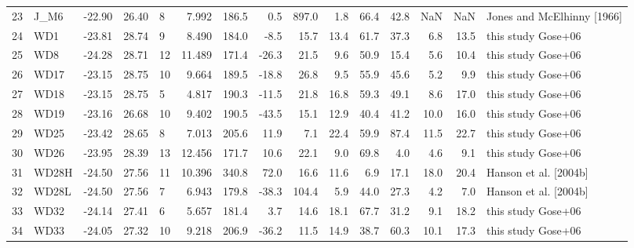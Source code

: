 \documentclass{article}
\begin{document}
{\begin{tabular}{llrrlrrrrrrrrrl}
23 &              J\_M6 &        -22.90 &          26.40 &      8 &   7.992 &  186.5 &   0.5 &  897.0 &   1.8 &  66.4 &   42.8 &   NaN &   NaN &     Jones and McElhinny [1966] \\
24 &               WD1 &        -23.81 &          28.74 &      9 &   8.490 &  184.0 &  -8.5 &   15.7 &  13.4 &  61.7 &   37.3 &   6.8 &  13.5 &             this study Gose+06 \\
25 &               WD8 &        -24.28 &          28.71 &     12 &  11.489 &  171.4 & -26.3 &   21.5 &   9.6 &  50.9 &   15.4 &   5.6 &  10.4 &             this study Gose+06 \\
26 &              WD17 &        -23.15 &          28.75 &     10 &   9.664 &  189.5 & -18.8 &   26.8 &   9.5 &  55.9 &   45.6 &   5.2 &   9.9 &             this study Gose+06 \\
27 &              WD18 &        -23.15 &          28.75 &      5 &   4.817 &  190.3 & -11.5 &   21.8 &  16.8 &  59.3 &   49.1 &   8.6 &  17.0 &             this study Gose+06 \\
28 &              WD19 &        -23.16 &          26.68 &     10 &   9.402 &  190.5 & -43.5 &   15.1 &  12.9 &  40.4 &   41.2 &  10.0 &  16.0 &             this study Gose+06 \\
29 &              WD25 &        -23.42 &          28.65 &      8 &   7.013 &  205.6 &  11.9 &    7.1 &  22.4 &  59.9 &   87.4 &  11.5 &  22.7 &             this study Gose+06 \\
30 &              WD26 &        -23.95 &          28.39 &     13 &  12.456 &  171.7 &  10.6 &   22.1 &   9.0 &  69.8 &    4.0 &   4.6 &   9.1 &             this study Gose+06 \\
31 &             WD28H &        -24.50 &          27.56 &     11 &  10.396 &  340.8 &  72.0 &   16.6 &  11.6 &   6.9 &   17.1 &  18.0 &  20.4 &          Hanson et al. [2004b] \\
32 &             WD28L &        -24.50 &          27.56 &      7 &   6.943 &  179.8 & -38.3 &  104.4 &   5.9 &  44.0 &   27.3 &   4.2 &   7.0 &          Hanson et al. [2004b] \\
33 &              WD32 &        -24.14 &          27.41 &      6 &   5.657 &  181.4 &   3.7 &   14.6 &  18.1 &  67.7 &   31.2 &   9.1 &  18.2 &             this study Gose+06 \\
34 &              WD33 &        -24.05 &          27.32 &     10 &   9.218 &  206.9 & -36.2 &   11.5 &  14.9 &  38.7 &   60.3 &  10.1 &  17.3 &             this study Gose+06 \\

\end{tabular}}
\end{document}
